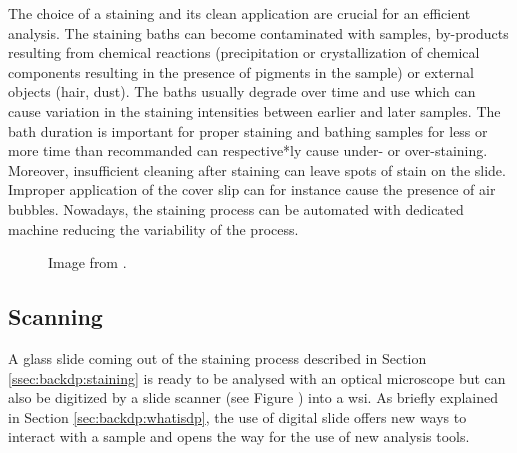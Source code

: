The choice of a staining and its clean application are crucial for an efficient analysis. The staining baths can become contaminated with samples, by-products resulting from chemical reactions (\eg precipitation or crystallization of chemical components resulting in the presence of pigments in the sample) or external objects (\eg hair, dust). The baths usually degrade over time and use which can cause variation in the staining intensities between earlier and later samples. The bath duration is important for proper staining and bathing samples for less or more time than recommanded can respective*ly cause under- or over-staining. Moreover, insufficient cleaning after staining can leave spots of stain on the slide. Improper application of the cover slip can for instance cause the presence of air bubbles. Nowadays, the staining process can be automated with dedicated machine reducing the variability of the process. 

\begin{figure}
  \centering
  \caption{ Image from \parencite{litjens2018camelyon}.}
  \label{fig:backdp:heeo-ihc}
\end{figure}

\subsection{Scanning}
\label{ssec:backdp:scanning}

A glass slide coming out of the staining process described in Section \ref{ssec:backdp:staining} is ready to be analysed with an optical microscope but can also be digitized by a slide scanner (see Figure ) into a \acrshort{wsi}. As briefly explained in Section \ref{sec:backdp:whatisdp}, the use of digital slide offers new ways to interact with a sample and opens the way for the use of new analysis tools.

